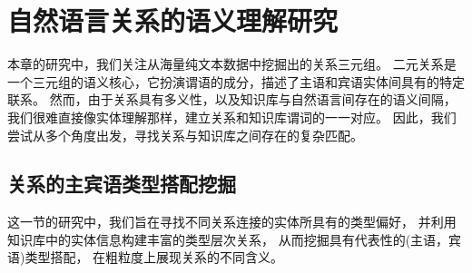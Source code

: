 
\chapter{自然语言关系的语义理解研究}
\label{chap:relation}


本章的研究中，我们关注从海量纯文本数据中挖掘出的关系三元组。
二元关系是一个三元组的语义核心，它扮演谓语的成分，描述了主语和宾语实体间具有的特定联系。
然而，由于关系具有多义性，以及知识库与自然语言间存在的语义间隔，
我们很难直接像实体理解那样，建立关系和知识库谓词的一一对应。
因此，我们尝试从多个角度出发，寻找关系与知识库之间存在的复杂匹配。




\section{关系的主宾语类型搭配挖掘}
\label{sec:tinf}

这一节的研究中，我们旨在寻找不同关系连接的实体所具有的类型偏好，
并利用知识库中的实体信息构建丰富的类型层次关系，
从而挖掘具有代表性的(主语，宾语)类型搭配，
在粗粒度上展现关系的不同含义。

